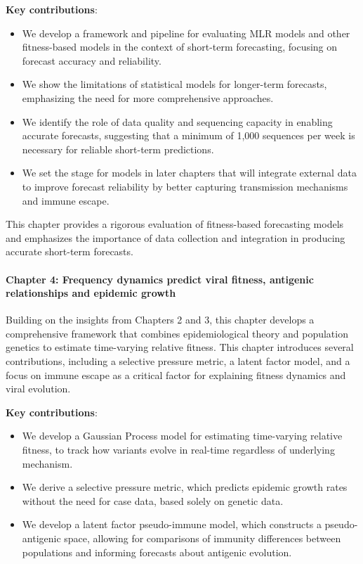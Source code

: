 \noindent\textbf{Key contributions}:
\begin{itemize}
        \item We develop a framework and pipeline for evaluating MLR models and other fitness-based models in the context of short-term forecasting, focusing on forecast accuracy and reliability.
        \item We show the limitations of statistical models for longer-term forecasts, emphasizing the need for more comprehensive approaches.
        \item We identify the role of data quality and sequencing capacity in enabling accurate forecasts, suggesting that a minimum of 1,000 sequences per week is necessary for reliable short-term predictions.
        \item We set the stage for models in later chapters that will integrate external data to improve forecast reliability by better capturing transmission mechanisms and immune escape.
\end{itemize}

This chapter provides a rigorous evaluation of fitness-based forecasting models and emphasizes the importance of data collection and integration in producing accurate short-term forecasts.

\paragraph{Chapter 4: Frequency dynamics predict viral fitness, antigenic relationships and epidemic growth}

Building on the insights from Chapters 2 and 3, this chapter develops a comprehensive framework that combines epidemiological theory and population genetics to estimate time-varying relative fitness.
This chapter introduces several contributions, including a selective pressure metric, a latent factor model, and a focus on immune escape as a critical factor for explaining fitness dynamics and viral evolution.

\noindent\textbf{Key contributions}:
\begin{itemize}
  \item We develop a Gaussian Process model for estimating time-varying relative fitness, to track how variants evolve in real-time regardless of underlying mechanism.
  \item We derive a selective pressure metric, which predicts epidemic growth rates without the need for case data, based solely on genetic data.
  \item We develop a latent factor pseudo-immune model, which constructs a pseudo-antigenic space, allowing for comparisons of immunity differences between populations and informing forecasts about antigenic evolution.
\end{itemize}

